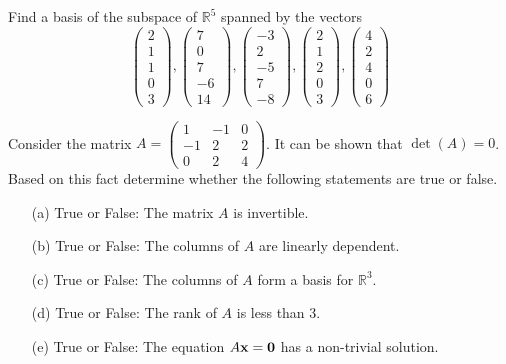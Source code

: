\begin{problem}
    Find a basis of the subspace of $\mathbb{R}^5$ spanned by the vectors
    \[ \begin{pmatrix} 2\\1\\1\\0\\3\end{pmatrix},
        \begin{pmatrix}7\\0\\7\\-6\\14\end{pmatrix},
        \begin{pmatrix}-3\\2\\-5\\7\\-8\end{pmatrix},
        \begin{pmatrix}2\\1\\2\\0\\3\end{pmatrix},
        \begin{pmatrix}4\\2\\4\\0\\6\end{pmatrix} \]
\end{problem}

\begin{problem}
    Consider the matrix $A = \begin{pmatrix} 1 & -1 & 0 \\ -1 & 2 & 2 \\ 0 & 2 & 4
    \end{pmatrix}$.  It can be shown that $\det(A) = 0$.  Based on this fact determine
    whether the following statements are true or false.
    \begin{enumerate}
            \item[(a)] True or False: The matrix $A$ is invertible.
            \item[(b)] True or False: The columns of $A$ are linearly dependent.
            \item[(c)] True or False: The columns of $A$ form a basis for $\mathbb{R}^3$.
            \item[(d)] True or False: The rank of $A$ is less than 3.
            \item[(e)] True or False: The equation $A {\bf x} = {\bf 0}$ has a non-trivial solution.
    \end{enumerate}
\end{problem}


